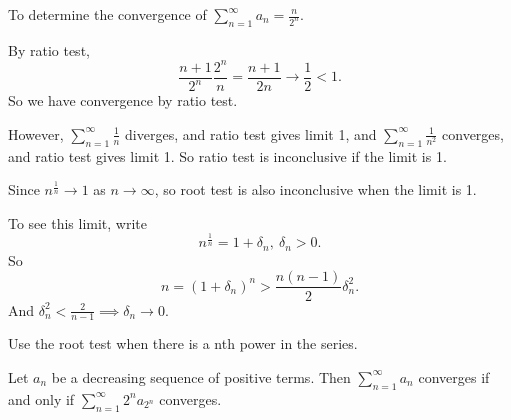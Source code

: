 \begin{example}
    To determine the convergence of \(\sum\limits_{n=1}^{\infty} a_n = \frac{n}{2^n}\).

    By ratio test,
    \[
        \frac{n + 1}{2^n}\frac{2^n}{n} = \frac{n + 1}{2n}\to \frac{1}{2}<1.
    \]
    So we have convergence by ratio test.

    However, \(\sum\limits_{n=1}^{\infty} \frac{1}{n}\) diverges, and ratio test gives limit 1, and \(\sum\limits_{n=1}^{\infty} \frac{1}{n^2}\) converges, and ratio test gives limit 1. So ratio test is inconclusive if the limit is 1.

    Since \(n^{\frac{1}{n}} \to 1\) as \(n \to \infty\), so root test is also inconclusive when the limit is 1.

    To see this limit, write
    \[
        n^{\frac{1}{n}} = 1 + \delta_n, ~\delta_n > 0.
    \]
    So
    \[
        n = (1 + \delta_n)^n > \frac{n(n-1)}{2}\delta_n^2.
    \]
    And \(\delta_n^2 < \frac{2}{n - 1}\implies \delta_n \to 0\).
\end{example}
\begin{remark}
    Use the root test when there is a nth power in the series.
\end{remark}
\begin{theorem}
    Let \(a_n\) be a decreasing sequence of positive terms. Then \(\sum\limits_{n=1}^{\infty} a_n\) converges if and only if \(\sum\limits_{n=1}^{\infty} 2^n a_{2^n}\) converges.
\end{theorem}
